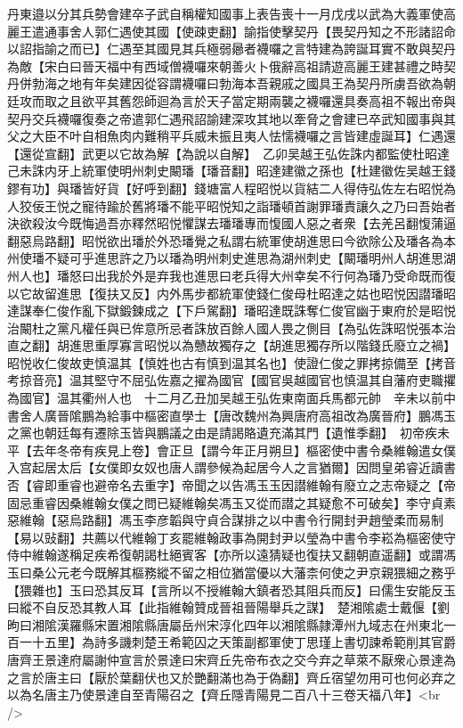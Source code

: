 丹東邉以分其兵勢會建卒子武自稱權知國事上表告喪十一月戊戌以武為大義軍使高麗王遣通事舍人郭仁遇使其國【使疎吏翻】諭指使擊契丹【畏契丹知之不形諸詔命以詔指諭之而已】仁遇至其國見其兵極弱曏者襪囉之言特建為誇誕耳實不敢與契丹為敵【宋白曰晉天福中有西域僧襪囉來朝善火卜俄辭高祖請遊高麗王建甚禮之時契丹併勃海之地有年矣建因從容謂襪囉曰勃海本吾親戚之國具王為契丹所虜吾欲為朝廷攻而取之且欲平其舊怨師迴為言於天子當定期兩襲之襪囉還具奏高祖不報出帝與契丹交兵襪囉復奏之帝遣郭仁遇飛詔諭建深攻其地以牽脅之會建已卒武知國事與其父之大臣不叶自相魚肉内難稍平兵威未振且夷人怯懦襪囉之言皆建虛誕耳】仁遇還【還從宣翻】武更以它故為解【為說以自解】　乙卯吴越王弘佐誅内都監使杜昭達己未誅内牙上統軍使明州刺史闞璠【璠音翻】昭達建徽之孫也【杜建徽佐吴越王錢鏐有功】與璠皆好貨【好呼到翻】錢塘富人程昭悦以貨結二人得侍弘佐左右昭悦為人狡佞王悦之寵待踰於舊將璠不能平昭悦知之詣璠頓首謝罪璠責讓久之乃曰吾始者決欲殺汝今既悔過吾亦釋然昭悦懼謀去璠璠專而愎國人惡之者衆【去羌呂翻愎蒲逼翻惡烏路翻】昭悦欲出璠於外恐璠覺之私謂右統軍使胡進思曰今欲除公及璠各為本州使璠不疑可乎進思許之乃以璠為明州刺史進思為湖州刺史【闞璠明州人胡進思湖州人也】璠怒曰出我於外是弃我也進思曰老兵得大州幸矣不行何為璠乃受命既而復以它故留進思【復扶又反】内外馬步都統軍使錢仁俊母杜昭達之姑也昭悦因譛璠昭達謀奉仁俊作亂下獄鍛鍊成之【下戶駕翻】璠昭達既誅奪仁俊官幽于東府於是昭悦治闞杜之黨凡權任與已侔意所忌者誅放百餘人國人畏之側目【為弘佐誅昭悦張本治直之翻】胡進思重厚寡言昭悦以為戇故獨存之【胡進思獨存所以階錢氏廢立之禍】昭悦收仁俊故吏慎温其【慎姓也古有慎到温其名也】使證仁俊之罪拷掠備至【拷音考掠音亮】温其堅守不屈弘佐嘉之擢為國官【國官吳越國官也慎温其自藩府吏職㩴為國官】温其衢州人也　十二月乙丑加吴越王弘佐東南面兵馬都元帥　辛未以前中書舍人廣晉隂鵬為給事中樞密直學士【唐改魏州為興唐府高祖改為廣晉府】鵬馮玉之黨也朝廷每有遷除玉皆與鵬議之由是請謁賂遺充滿其門【遺惟季翻】　初帝疾未平【去年冬帝有疾見上卷】會正旦【謂今年正月朔旦】樞密使中書令桑維翰遣女僕入宫起居太后【女僕即女奴也唐人謂參候為起居今人之言猶爾】因問皇弟睿近讀書否【睿即重睿也避帝名去重字】帝聞之以告馮玉玉因譛維翰有廢立之志帝疑之【帝固忌重睿因桑維翰女僕之問已疑維翰矣馮玉又從而譛之其疑愈不可破矣】李守貞素惡維翰【惡烏路翻】馮玉李彦韜與守貞合謀排之以中書令行開封尹趙瑩柔而易制【易以䜴翻】共薦以代維翰丁亥罷維翰政事為開封尹以瑩為中書令李崧為樞密使守侍中維翰遂稱足疾希復朝謁杜絕賓客【亦所以遠猜疑也復扶又翻朝直遥翻】或謂馮玉曰桑公元老今既解其樞務縱不留之相位猶當優以大藩柰何使之尹京親猥細之務乎【猥雜也】玉曰恐其反耳【言所以不授維翰大鎮者恐其阻兵而反】曰儒生安能反玉曰縱不自反恐其教人耳【此指維翰贊成晉祖晉陽舉兵之謀】　楚湘隂處士戴偃【劉昫曰湘隂漢羅縣宋置湘隂縣唐屬岳州宋淳化四年以湘隂縣隷潭州九域志在州東北一百一十五里】為詩多譏刺楚王希範囚之天策副都軍使丁思瑾上書切諫希範削其官爵　唐齊王景達府屬謝仲宣言於景達曰宋齊丘先帝布衣之交今弃之草萊不厭衆心景達為之言於唐主曰【厭於葉翻伏也又於艷翻滿也為于偽翻】齊丘宿望勿用可也何必弃之以為名唐主乃使景達自至青陽召之【齊丘隱青陽見二百八十三卷天福八年】<br />
